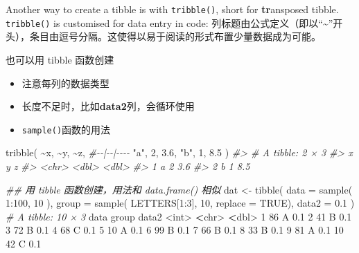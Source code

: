 \documentclass[
]{article}
\newenvironment{Shaded}{}{}
\newcommand{\AttributeTok}[1]{\textcolor[rgb]{0.49,0.56,0.16}{#1}}
\newcommand{\CommentTok}[1]{\textcolor[rgb]{0.38,0.63,0.69}{\textit{#1}}}
\newcommand{\ConstantTok}[1]{\textcolor[rgb]{0.53,0.00,0.00}{#1}}
\newcommand{\DecValTok}[1]{\textcolor[rgb]{0.25,0.63,0.44}{#1}}
\newcommand{\DocumentationTok}[1]{\textcolor[rgb]{0.73,0.13,0.13}{\textit{#1}}}
\newcommand{\ErrorTok}[1]{\textcolor[rgb]{1.00,0.00,0.00}{\textbf{#1}}}
\newcommand{\FloatTok}[1]{\textcolor[rgb]{0.25,0.63,0.44}{#1}}
\newcommand{\FunctionTok}[1]{\textcolor[rgb]{0.02,0.16,0.49}{#1}}
\newcommand{\NormalTok}[1]{#1}
\newcommand{\OtherTok}[1]{\textcolor[rgb]{0.00,0.44,0.13}{#1}}
\newcommand{\SpecialCharTok}[1]{\textcolor[rgb]{0.25,0.44,0.63}{#1}}
\newcommand{\StringTok}[1]{\textcolor[rgb]{0.25,0.44,0.63}{#1}}
\begin{document}
Another way to create a tibble is with \texttt{tribble()}, short for
\textbf{tr}ansposed tibble. \texttt{tribble()} is customised for data
entry in code:
列标题由公式定义（即以``\textasciitilde''开头），条目由逗号分隔。这使得以易于阅读的形式布置少量数据成为可能。

也可以用 tibble 函数创建

\begin{itemize}
\item
  注意每列的数据类型
\item
  长度不足时，比如\textbf{data2}列，会循环使用
\item
  \texttt{sample()}函数的用法
\end{itemize}

\begin{Shaded}
\begin{Highlighting}[]
\FunctionTok{tribble}\NormalTok{(}
  \SpecialCharTok{\textasciitilde{}}\NormalTok{x, }\SpecialCharTok{\textasciitilde{}}\NormalTok{y, }\SpecialCharTok{\textasciitilde{}}\NormalTok{z,}
  \CommentTok{\#{-}{-}|{-}{-}|{-}{-}{-}{-}}
  \StringTok{"a"}\NormalTok{, }\DecValTok{2}\NormalTok{, }\FloatTok{3.6}\NormalTok{,}
  \StringTok{"b"}\NormalTok{, }\DecValTok{1}\NormalTok{, }\FloatTok{8.5}
\NormalTok{)}
\CommentTok{\#\textgreater{} \# A tibble: 2 × 3}
\CommentTok{\#\textgreater{}   x         y     z}
\CommentTok{\#\textgreater{}   \textless{}chr\textgreater{} \textless{}dbl\textgreater{} \textless{}dbl\textgreater{}}
\CommentTok{\#\textgreater{} 1 a         2   3.6}
\CommentTok{\#\textgreater{} 2 b         1   8.5}

\DocumentationTok{\#\# 用 tibble 函数创建，用法和 data.frame() 相似}
\NormalTok{dat }\OtherTok{\textless{}{-}} 
  \FunctionTok{tibble}\NormalTok{( }\AttributeTok{data =} \FunctionTok{sample}\NormalTok{( }\DecValTok{1}\SpecialCharTok{:}\DecValTok{100}\NormalTok{, }\DecValTok{10}\NormalTok{ ), }
        \AttributeTok{group =} \FunctionTok{sample}\NormalTok{( LETTERS[}\DecValTok{1}\SpecialCharTok{:}\DecValTok{3}\NormalTok{], }\DecValTok{10}\NormalTok{, }\AttributeTok{replace =} \ConstantTok{TRUE}\NormalTok{), }
        \AttributeTok{data2 =} \FloatTok{0.1}\NormalTok{ )}
\CommentTok{\# A tibble: 10 × 3}
\NormalTok{    data group data2}
   \SpecialCharTok{\textless{}}\NormalTok{int}\SpecialCharTok{\textgreater{}} \ErrorTok{\textless{}}\NormalTok{chr}\SpecialCharTok{\textgreater{}} \ErrorTok{\textless{}}\NormalTok{dbl}\SpecialCharTok{\textgreater{}}
 \DecValTok{1}    \DecValTok{86}\NormalTok{ A       }\FloatTok{0.1}
 \DecValTok{2}    \DecValTok{41}\NormalTok{ B       }\FloatTok{0.1}
 \DecValTok{3}    \DecValTok{72}\NormalTok{ B       }\FloatTok{0.1}
 \DecValTok{4}    \DecValTok{68}\NormalTok{ C       }\FloatTok{0.1}
 \DecValTok{5}    \DecValTok{10}\NormalTok{ A       }\FloatTok{0.1}
 \DecValTok{6}    \DecValTok{99}\NormalTok{ B       }\FloatTok{0.1}
 \DecValTok{7}    \DecValTok{66}\NormalTok{ B       }\FloatTok{0.1}
 \DecValTok{8}    \DecValTok{33}\NormalTok{ B       }\FloatTok{0.1}
 \DecValTok{9}    \DecValTok{81}\NormalTok{ A       }\FloatTok{0.1}
\DecValTok{10}    \DecValTok{42}\NormalTok{ C       }\FloatTok{0.1}
\end{Highlighting}
\end{Shaded}
\end{document}
